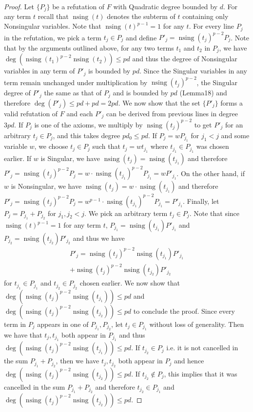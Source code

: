 \documentclass[10pt,a4paper]{article}
\DeclareMathOperator{\nsing}{nsing}
\begin{document}
\begin{proof}
Let $\{P_j\}$ be a refutation of $F$ with Quadratic degree bounded by $d$. For any term $t$ recall that $\nsing(t)$ denotes the subterm of $t$ containing only Nonsingular variables. Note that $\nsing(t)^{p-1}=1$ for any $t$. For every line $P_j$ in the refutation, we pick a term $t_j\in P_j$ and define $P'_j=\nsing(t_j)^{p-2}P_j$. Note that by the arguments outlined above, for any two terms $t_1$ and $t_2$ in $P_j$, we have $\deg(\nsing(t_1)^{p-2}\nsing(t_2))\leq pd$ and thus the degree of Nonsingular variables in any term of $P'_j$ is bounded by $pd$. Since the Singular variables in any term remain unchanged under multiplication by $\nsing(t_j)^{p-2}$, the Singular degree of $P'_j$ the same as that of $P_j$ and is bounded by $pd$ (Lemma18) and therefore $\deg(P'_j)\leq pd+pd=2pd$. We now show that the set $\{P'_j\}$ forms a valid refutation of $F$ and each $P'_j$ can be derived from previous lines in degree $3pd$. If $P_j$ is one of the axioms, we multiply by $\nsing(t_j)^{p-2}$ to get $P'_j$ for an arbitrary $t_j\in P_j$, and this takes degree $pd_0\leq pd$.
If $P_j=wP_{j_1}$ for $j_1<j$ and some variable $w$, we choose $t_j\in P_j$ such that $t_j=wt_{j_1}$ where $t_{j_1}\in P_{j_1}$ was chosen earlier. If $w$ is Singular, we have $\nsing(t_j)=\nsing(t_{j_1})$ and therefore $P'_j=\nsing(t_j)^{p-2}P_j=w\cdot\nsing(t_{j_1})^{p-2}P_{j_1}=wP'_{j_1}$. On the other hand, if $w$ is Nonsingular, we have $\nsing(t_j)=w\cdot\nsing(t_{j_1})$ and therefore $P'_j=\nsing(t_j)^{p-2}P_j=w^{p-1}\cdot\nsing(t_{j_1})^{p-2}P_{j_1}=P'_{j_1}$. Finally, let $P_j=P_{j_1}+P_{j_2}$ for $j_1,j_2<j$. We pick an arbitrary term $t_j\in P_j$. Note that since $\nsing(t)^{p-1}=1$ for any term $t$, $P_{j_1}=\nsing(t_{j_1})P'_{j_1}$ and $P_{j_2}=\nsing(t_{j_2})P'_{j_2}$ and thus we have
\begin{multline*}
P'_j=\nsing(t_j)^{p-2}\nsing(t_{j_1})P'_{j_1}\\
+\nsing(t_j)^{p-2}\nsing(t_{j_2})P'_{j_2}
\end{multline*}
for $t_{j_1}\in P_{j_1}$ and $t_{j_2}\in P_{j_2}$ chosen earlier. We now show that $\deg(\nsing(t_j)^{p-2}\nsing(t_{j_1}))\leq pd$ and $\deg(\nsing(t_j)^{p-2}\nsing(t_{j_2}))\leq pd$ to conclude the proof. Since every term in $P_j$ appears in one of $P_{j_1},P_{j_2}$, let $t_j\in P_{j_1}$ without loss of generality. Then we have that $t_j,t_{j_1}$ both appear in $P_{j_1}$ and thus $\deg(\nsing(t_j)^{p-2}\nsing(t_{j_1}))\leq pd$. If $t_{j_2}\in P_j$ i.e. it is not cancelled in the sum $P_{j_1}+P_{j_2}$, then we have $t_j,t_{j_2}$ both appear in $P_j$ and hence $\deg(\nsing(t_j)^{p-2}\nsing(t_{j_2}))\leq pd$. If $t_{j_2}\notin P_j$, this implies that it was cancelled in the sum $P_{j_1}+P_{j_2}$ and therefore $t_{j_2}\in P_{j_1}$ and $\deg(\nsing(t_j)^{p-2}\nsing(t_{j_2}))\leq pd$.
\end{proof}
\end{document}
